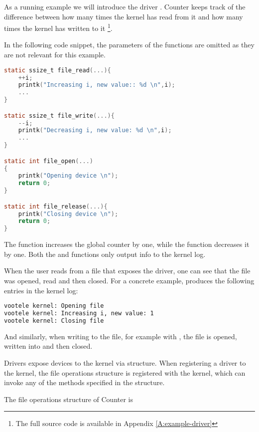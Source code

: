 \documentclass[..thesis.tex]{subfiles}
\begin{document}
As a running example we will introduce the driver .
Counter keeps track of the difference between how many times the kernel has read from it and how many times the kernel has written to it
\footnote{The full source code is available in Appendix \ref{A:example-driver}}.

In the following code snippet, the parameters of the functions are omitted as they are not relevant for this example.



\begin{lstlisting}[language=C,style=def]
static ssize_t file_read(...){
    ++i;
    printk("Increasing i, new value:: %d \n",i);
    ...
}

static ssize_t file_write(...){
    --i;
    printk("Decreasing i, new value: %d \n",i);
    ...
}

static int file_open(...)
{
    printk("Opening device \n");
    return 0;
}

static int file_release(...){
    printk("Closing device \n");
    return 0;
}


\end{lstlisting}

The  function increases the global counter by one, while the  function decreases it by one.
Both the  and  functions only output info to the kernel log.

When the user reads from a file that exposes the driver, one can see that the file was opened, read and then closed. For a concrete example,
 produces the following entries in the kernel log:

\begin{lstlisting}[language=sh,style=def]
vootele kernel: Opening file 
vootele kernel: Increasing i, new value: 1 
vootele kernel: Closing file 
\end{lstlisting}

And similarly, when writing to the file, for example with , the file is opened, written into and then closed.


Drivers expose devices to the kernel via  structure. When registering a driver to the kernel,
the file operations structure is registered with the kernel, which can invoke any of the methods specified in the structure.

The file operations structure of Counter is 
\end{document}
